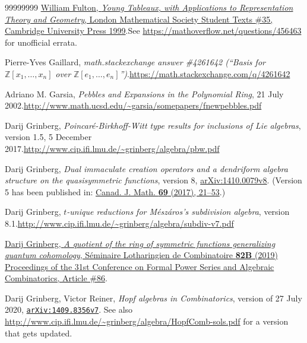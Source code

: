 \documentclass[numbers=enddot,12pt,final,onecolumn,notitlepage]{scrartcl}%
\theoremstyle{definition}
\begin{document}
\begin{thebibliography}{99999999}
%
\href{https://doi.org/10.1017/CBO9780511626241}{William Fulton, \textit{Young
Tableaux, with Applications to Representation Theory and Geometry}, London
Mathematical Society Student Texts \#35, Cambridge University Press
1999}.\newline See \url{https://mathoverflow.net/questions/456463} for
unofficial errata.

Pierre-Yves Gaillard, \textit{math.stackexchange
answer \#4261642 (\textquotedblleft Basis for }$\mathbb{Z}\left[  x_{1}%
,\ldots,x_{n}\right]  $ \textit{over }$\mathbb{Z}\left[  e_{1},\ldots
,e_{n}\right]  $\textit{\textquotedblright)}.\newline\url{https://math.stackexchange.com/q/4261642}

Adriano M. Garsia, \textit{Pebbles and Expansions
in the Polynomial Ring}, 21 July 2002.\newline\url{http://www.math.ucsd.edu/~garsia/somepapers/fnewpebbles.pdf}

Darij Grinberg, \textit{Poincar\'{e}-Birkhoff-Witt
type results for inclusions of Lie algebras}, version 1.5, 5 December
2017.\newline\url{http://www.cip.ifi.lmu.de/~grinberg/algebra/pbw.pdf}

Darij Grinberg, \textit{Dual immaculate creation
operators and a dendriform algebra structure on the quasisymmetric functions},
version 8, \href{https://arxiv.org/abs/1410.0079v8}{arXiv:1410.0079v8}.
(Version 5 has been published in:
\href{https://cms.math.ca/10.4153/CJM-2016-018-8?abfmt=ltx}{Canad. J. Math.
\textbf{69} (2017), 21--53}.)

Darij Grinberg, $\mathit{t}$\textit{-unique
reductions for M\'{e}sz\'{a}ros's subdivision algebra}, version 8.1.\newline\url{http://www.cip.ifi.lmu.de/~grinberg/algebra/subdiv-v7.pdf}

%
\href{http://fpsac2019.fmf.uni-lj.si/resources/Proceedings/158.pdf}{Darij
Grinberg, \textit{A quotient of the ring of symmetric functions generalizing
quantum cohomology}, S\'{e}minaire Lotharingien de Combinatoire \textbf{82B}
(2019) Proceedings of the 31st Conference on Formal Power Series and Algebraic
Combinatorics, Article \#86}.

Darij Grinberg, Victor Reiner, \textit{Hopf
algebras in Combinatorics}, version of 27 July 2020,
\href{http://www.arxiv.org/abs/1409.8356v7}{\texttt{arXiv:1409.8356v7}}.
\newline See also
\url{http://www.cip.ifi.lmu.de/~grinberg/algebra/HopfComb-sols.pdf} for a
version that gets updated.


\end{thebibliography}
\end{document}
